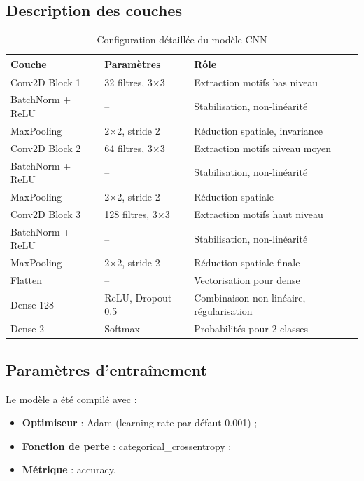 \documentclass[11pt,a4paper]{article}
\begin{document}
\subsection{Description des couches}

\begin{table}[H]
\centering
\caption{Configuration détaillée du modèle CNN}
\label{tab:cnn-config}
\begin{tabular}{lll}
\toprule
\textbf{Couche} & \textbf{Paramètres} & \textbf{Rôle} \\
\midrule
Conv2D Block 1 & 32 filtres, 3$\times$3 & Extraction motifs bas niveau \\
BatchNorm + ReLU & -- & Stabilisation, non-linéarité \\
MaxPooling & 2$\times$2, stride 2 & Réduction spatiale, invariance \\
\midrule
Conv2D Block 2 & 64 filtres, 3$\times$3 & Extraction motifs niveau moyen \\
BatchNorm + ReLU & -- & Stabilisation, non-linéarité \\
MaxPooling & 2$\times$2, stride 2 & Réduction spatiale \\
\midrule
Conv2D Block 3 & 128 filtres, 3$\times$3 & Extraction motifs haut niveau \\
BatchNorm + ReLU & -- & Stabilisation, non-linéarité \\
MaxPooling & 2$\times$2, stride 2 & Réduction spatiale finale \\
\midrule
Flatten & -- & Vectorisation pour dense \\
Dense 128 & ReLU, Dropout 0.5 & Combinaison non-linéaire, régularisation \\
Dense 2 & Softmax & Probabilités pour 2 classes \\
\bottomrule
\end{tabular}
\end{table}

\subsection{Paramètres d'entraînement}

Le modèle a été compilé avec :
\begin{itemize}
    \item \textbf{Optimiseur} : Adam (learning rate par défaut 0.001) ;
    \item \textbf{Fonction de perte} : categorical\_crossentropy ;
    \item \textbf{Métrique} : accuracy.
\end{itemize}
\end{document}
